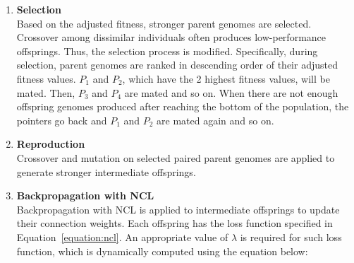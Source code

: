 \begin{enumerate}
    Below contains the pseudo-code used to update the raw fitness of 1 base learner by taking into account sharing factor during fitness sharing: 

    \begin{lstlisting}[language=Python, caption={Modified fitness sharing}]
    # The sharing factor of current_base_learner
    sharing_factor = 0
    # Calculate the dynamic niche radius based on the current ensemble size m
    sigma = get_dynamic_niche_radius(m)
    # A scaling factor pre-computed by developers
    alpha = 1

    for other_base_learner in population where other_base_learner is not current_base_learner:
        d = get_genetic_distance(current_base_learner, other_base_learner)

        if d < sigma:
            # current_base_learner is genetically too close to other_base_learner
            sharing_factor += 1 - (d / sigma) ** alpha
        
    # sharing_factor is ready

    # Update the raw fitness of the current base learner for fitness sharing
    current_base_learner.fitness = current_base_learner.fitness / sharing_factor
    \end{lstlisting}
    The fitness of every base learner is updated using the above algorithm. The updated fitness is called \textit{adjusted fitness}. 

    \item \textbf{Selection} \\
    Based on the adjusted fitness, stronger parent genomes are selected. Crossover among dissimilar individuals often produces low-performance offsprings. Thus, the selection process is modified. Specifically, during selection, parent genomes are ranked in descending order of their adjusted fitness values. $P_1$ and $P_2$, which have the 2 highest fitness values, will be mated. Then, $P_3$ and $P_4$ are mated and so on. When there are not enough offspring genomes produced after reaching the bottom of the population, the pointers go back and $P_1$ and $P_2$ are mated again and so on. 

    \item \textbf{Reproduction} \\
    Crossover and mutation on selected paired parent genomes are applied to generate stronger intermediate offsprings. 

    \item \textbf{Backpropagation with NCL} \\
    Backpropagation with NCL is applied to intermediate offsprings to update their connection weights. Each offspring has the loss function specified in Equation~\ref{equation:ncl}. An appropriate value of $\lambda$ is required for such loss function, which is dynamically computed using the equation below: 
    

\end{enumerate}
